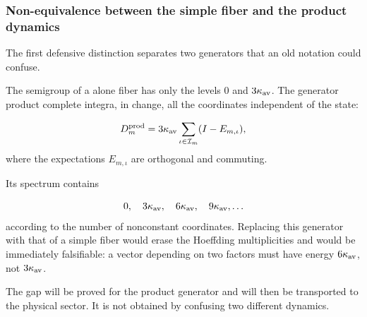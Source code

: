 \subsubsection{Non-equivalence between the simple fiber and the product dynamics}
The first defensive distinction separates two generators that an old notation could confuse.\par
The semigroup of a alone fiber has only the levels \(0\) and \(3\kappa_{\rm av}\). The generator product complete integra, in change, all the coordinates independent of the state:\par
\[
D_m^{\rm prod}
=
3\kappa_{\rm av}
\sum_{\iota\in\mathcal I_m}(I-E_{m,\iota}),
\]
where the expectations \(E_{m,\iota}\) are orthogonal and commuting.\par
Its spectrum contains\par
\[
0,\quad
3\kappa_{\rm av},\quad
6\kappa_{\rm av},\quad
9\kappa_{\rm av},\ldots
\]
according to the number of nonconstant coordinates. Replacing this generator with that of a simple fiber would erase the Hoeffding multiplicities and would be immediately falsifiable: a vector depending on two factors must have energy \(6\kappa_{\rm av}\), not \(3\kappa_{\rm av}\).\par
The gap will be proved for the product generator and will then be transported to the physical sector. It is not obtained by confusing two different dynamics.\par
{}
